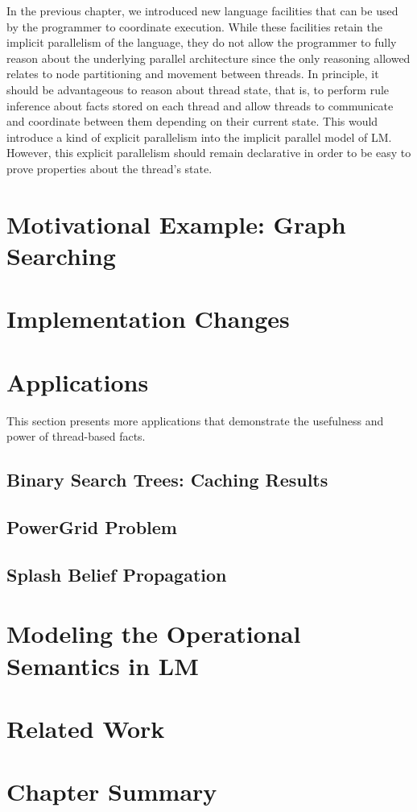 In the previous chapter, we introduced new language facilities that can be used
by the programmer to coordinate execution. While these facilities retain the
implicit parallelism of the language, they do not allow the programmer to fully
reason about the underlying parallel architecture since the only reasoning
allowed relates to node partitioning and movement between threads. In principle,
it should be advantageous to reason about thread state, that is, to perform rule
inference about facts stored on each thread and allow threads to communicate and
coordinate between them depending on their current state. This would introduce a
kind of explicit parallelism into the implicit parallel model of LM.
However, this explicit parallelism should remain declarative in order to be easy
to prove properties about the thread's state.

\section{Motivational Example: Graph Searching}


\section{Implementation Changes}


\section{Applications}

This section presents more applications that demonstrate the usefulness and
power of thread-based facts.

\subsection{Binary Search Trees: Caching Results}


\subsection{PowerGrid Problem}


\subsection{Splash Belief Propagation}\label{sec:coordination:bp}


\section{Modeling the Operational Semantics in LM}


\section{Related Work}


\section{Chapter Summary}

